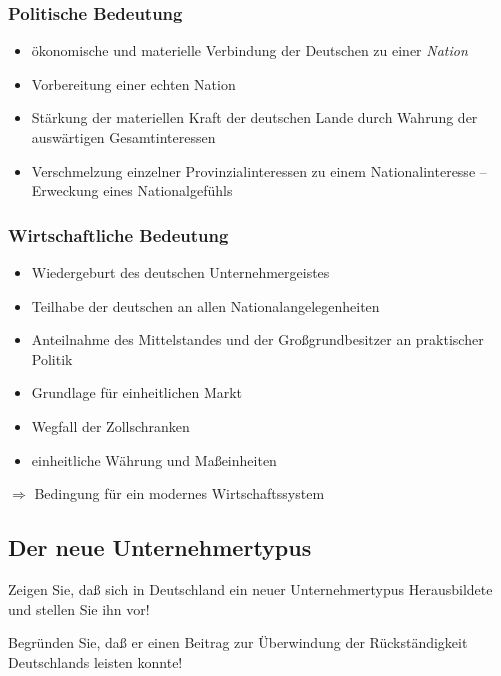 \subsubsection{Politische Bedeutung}

\begin{itemize}
\item ökonomische und materielle Verbindung der Deutschen zu einer
\emph{Nation}
\item Vorbereitung einer echten Nation
\item Stärkung der materiellen Kraft der deutschen Lande durch Wahrung
der auswärtigen Gesamtinteressen
\item Verschmelzung einzelner Provinzialinteressen zu einem
Nationalinteresse -- Erweckung eines Nationalgefühls
\end{itemize}

\subsubsection{Wirtschaftliche Bedeutung}

\begin{itemize}
\item {} Wiedergeburt des deutschen Unternehmergeistes
\item {} Teilhabe der deutschen an allen
Nationalangelegenheiten 
\item {} Anteilnahme des Mittelstandes und der
Großgrundbesitzer an praktischer Politik
\item Grundlage für einheitlichen Markt
\item Wegfall der Zollschranken
\item einheitliche Währung und Maßeinheiten
\end{itemize}

$\Longrightarrow$ Bedingung für ein modernes Wirtschaftssystem



\subsection{Der neue Unternehmertypus}

\begin{aufgabe}
Zeigen Sie, daß sich in Deutschland ein neuer Unternehmertypus
Herausbildete und stellen Sie ihn vor!

Begründen Sie, daß er einen Beitrag zur Überwindung der
Rückständigkeit Deutschlands leisten konnte!
\end{aufgabe}

